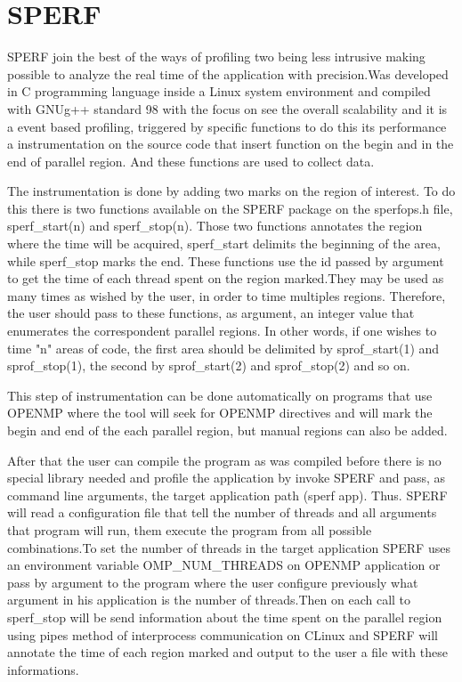 \documentclass[sigconf]{acmart}
\begin{document}
\section{SPERF}
\label{sec:sperf}

SPERF join the best of the ways of profiling two being less intrusive making possible to analyze the real time of the application with precision.Was developed in C programming language inside a Linux system environment and compiled with GNU\/g++ standard 98 with the focus on see the overall scalability and it is a event based profiling, triggered by specific functions to do this its performance a instrumentation on the source code that insert function on the begin and in the end of parallel region. And these functions are used to collect data.

The instrumentation is done by adding two marks on the region of interest. To do this there is two functions available on the SPERF package on the sperfops.h file, sperf\_start(n) and sperf\_stop(n). Those two functions annotates the region where the time will be acquired, sperf\_start delimits the beginning of the area, while sperf\_stop marks the end. These functions use the id passed by argument to get the time of each thread spent on the region marked.They may be used as many times as wished by the user, in order to time multiples regions. Therefore, the user should pass to these functions, as argument, an integer value that enumerates the correspondent parallel regions. In other words, if one wishes to time "n" areas of code, the first area should be delimited by sprof\_start(1) and sprof\_stop(1), the second by sprof\_start(2) and sprof\_stop(2) and so on.

This step of instrumentation can be done automatically on programs that use OPENMP \cite{Architecture2015} where the tool will seek for OPENMP directives and will mark the begin and end of the each parallel region, but manual regions can also be added.

After that the user can compile the program as was compiled before there is no special library needed and profile the application by invoke SPERF and pass, as command line arguments, the target application path (sperf app). Thus. SPERF will read a configuration file that tell the number of threads and all arguments that program will run, them execute the program from all possible combinations.To set the number of threads in the target application SPERF uses an environment variable OMP\_NUM\_THREADS on OPENMP application or pass by argument to the program where the user configure previously what argument in his application is the number of threads.Then on each call to sperf\_stop will be send information about the time spent on the parallel region using pipes method of interprocess communication on C\/Linux and SPERF will annotate the time of each region marked and output to the user a file with these informations.
\end{document}
